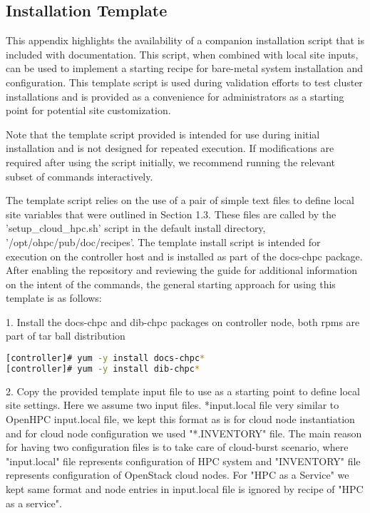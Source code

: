 \renewcommand\thesubsection{\Alph{subsection}}
\subsection{Installation Template}

This appendix highlights the availability of a companion installation script that is included with documentation. This script, when combined with local site inputs, can be used to implement a starting
recipe for bare-metal system installation and configuration. This template script is used during validation efforts to test cluster installations and is provided as a convenience for administrators as a starting point for potential site customization.
\begin{center}
	\begin{tcolorbox}[]
		\small
Note that the template script provided is intended for use during initial installation and is not designed for
repeated execution. If modifications are required after using the script initially, we recommend running the
relevant subset of commands interactively.
\end{tcolorbox}
\end{center}
The template script relies on the use of a pair of simple text files to define local site variables that were outlined
in Section 1.3. These files are called by the 'setup\_cloud\_hpc.sh' script in the default install directory, '/opt/ohpc/pub/doc/recipes'.
The template install script is intended for execution on the controller host and is installed as part of the docs-chpc package. After enabling the repository and reviewing the guide for additional information on the intent of the commands, the general starting approach for using this template
is as follows:


1. Install the docs-chpc and dib-chpc packages on controller node, both rpms are part of tar ball distribution

\begin{lstlisting}[language=bash,keywords={},upquote=true]
[controller]# yum -y install docs-chpc*
[controller]# yum -y install dib-chpc*
\end{lstlisting}

2. Copy the provided template input file to use as a starting point to define local site settings. Here we assume two input files. *input.local file very similar to OpenHPC input.local file, we kept this format as is for cloud node instantiation and for cloud node configuration we used "*.INVENTORY" file. The main reason for having two configuration files is to take care of cloud-burst scenario, where "input.local" file represents configuration of HPC system and "INVENTORY" file represents configuration of OpenStack cloud nodes. For "HPC as a Service" we kept same format and node entries in input.local file is ignored by recipe of "HPC as  a service".

